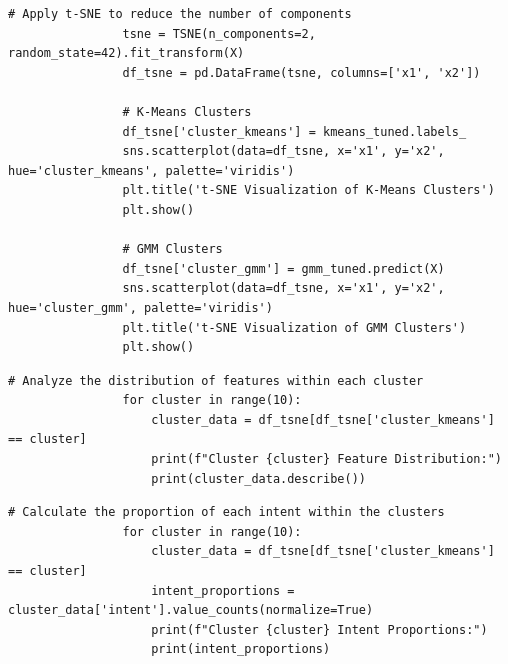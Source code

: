             \vspace{0.5em}

            \begin{lstlisting}[caption={t-SNE Visualization of Clusters}, label={lst:tsne_visualization}]
                # Apply t-SNE to reduce the number of components
                tsne = TSNE(n_components=2, random_state=42).fit_transform(X)
                df_tsne = pd.DataFrame(tsne, columns=['x1', 'x2'])
                
                # K-Means Clusters
                df_tsne['cluster_kmeans'] = kmeans_tuned.labels_
                sns.scatterplot(data=df_tsne, x='x1', y='x2', hue='cluster_kmeans', palette='viridis')
                plt.title('t-SNE Visualization of K-Means Clusters')
                plt.show()
                
                # GMM Clusters
                df_tsne['cluster_gmm'] = gmm_tuned.predict(X)
                sns.scatterplot(data=df_tsne, x='x1', y='x2', hue='cluster_gmm', palette='viridis')
                plt.title('t-SNE Visualization of GMM Clusters')
                plt.show()
            \end{lstlisting}
            
            \vspace{0.5em}

            \begin{lstlisting}[caption={Feature Distribution Analysis by Cluster}, label={lst:feature_distribution}]
                # Analyze the distribution of features within each cluster
                for cluster in range(10):
                    cluster_data = df_tsne[df_tsne['cluster_kmeans'] == cluster]
                    print(f"Cluster {cluster} Feature Distribution:")
                    print(cluster_data.describe())
            \end{lstlisting}
            
            \vspace{0.5em}

            \begin{lstlisting}[caption={Intent Proportions Analysis by Cluster}, label={lst:intent_proportions}]
                # Calculate the proportion of each intent within the clusters
                for cluster in range(10):
                    cluster_data = df_tsne[df_tsne['cluster_kmeans'] == cluster]
                    intent_proportions = cluster_data['intent'].value_counts(normalize=True)
                    print(f"Cluster {cluster} Intent Proportions:")
                    print(intent_proportions)
            \end{lstlisting}
            

